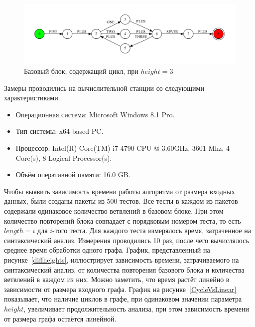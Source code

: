 \begin{figure}[h!]
 \centering
 \includegraphics[width=15cm]{pics/block_loop.pdf}
 \caption{Базовый блок, содержащий цикл, при $height=3$}
 \label{block_loop}
\end{figure}

Замеры проводились на вычислительной станции со следующими характеристиками.
\begin{itemize}
\item Операционная система: Microsoft Windows 8.1 Pro.
\item Тип системы: x64-based PC.
\item Процессор: Intel(R) Core(TM) i7-4790 CPU @ 3.60GHz, 3601 Mhz, 4 Core(s), 8 Logical Processor(s).
\item Объём оперативной памяти: 16.0 GB.
\end{itemize}

Чтобы выявить зависимость времени работы алгоритма от размера входных данных, были созданы пакеты из $500$ тестов. Все тесты в каждом из пакетов содержали одинаковое количество ветвлений в базовом блоке. 
При этом количество повторений блока совпадает с порядковым номером теста, то есть $length=i$ для $i$-того теста. Для каждого теста измерялось время, затраченное на синтаксический анализ. Измерения проводились 
10 раз, после чего вычислялось среднее время обработки одного графа. График, представленный на рисунке~\ref{diffheights}, иллюстрирует зависимость времени, затрачиваемого на синтаксический анализ, от количества повторения базового блока и 
количества ветвлений в каждом из них. Можно заметить, что время растёт линейно в зависимости от размера входного графа. График на рисунке~\ref{CycleVsLinear} показывает, что 
наличие циклов в графе, при одинаковом значении параметра $height$, увеличивает продолжительность анализа, при этом зависимость времени от размера графа остаётся линейной.

